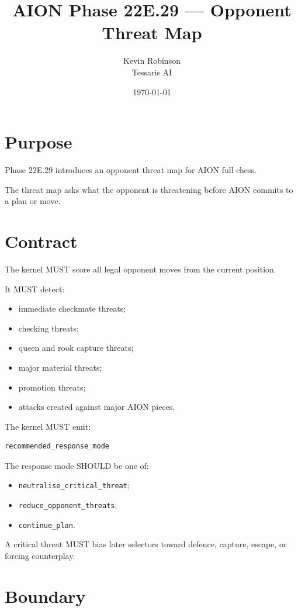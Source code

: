 \documentclass[11pt,a4paper]{article}
\title{\textbf{AION Phase 22E.29 --- Opponent Threat Map}}
\author{Kevin Robinson\\Tessaris AI}
\date{\today}
\begin{document}
\maketitle

\section{Purpose}

Phase 22E.29 introduces an opponent threat map for AION full chess.

The threat map asks what the opponent is threatening before AION commits to a plan or move.

\section{Contract}

The kernel MUST score all legal opponent moves from the current position.

It MUST detect:

\begin{itemize}[leftmargin=*]
  \item immediate checkmate threats;
  \item checking threats;
  \item queen and rook capture threats;
  \item major material threats;
  \item promotion threats;
  \item attacks created against major AION pieces.
\end{itemize}

The kernel MUST emit:

\begin{verbatim}
recommended_response_mode
\end{verbatim}

The response mode SHOULD be one of:

\begin{itemize}[leftmargin=*]
  \item \texttt{neutralise\_critical\_threat};
  \item \texttt{reduce\_opponent\_threats};
  \item \texttt{continue\_plan}.
\end{itemize}

A critical threat MUST bias later selectors toward defence, capture, escape, or forcing counterplay.

\section{Boundary}
\end{document}
